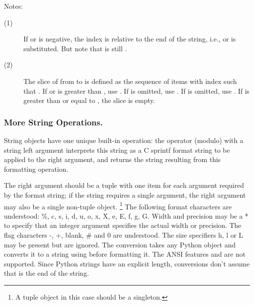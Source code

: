 \noindent
Notes:

\begin{description}
  
\item[(1)] If  or  is negative, the index is relative to
  the end of the string, i.e.,  or
   is substituted.  But note that  is
  still .
  
\item[(2)] The slice of  from  to  is defined as
  the sequence of items with index  such that .  If  or  is greater than
  , use .  If  is omitted,
  use .  If  is omitted, use .  If
   is greater than or equal to , the slice is empty.

\end{description}

\subsubsection{More String Operations.}

String objects have one unique built-in operation: the \code{\%}
operator (modulo) with a string left argument interprets this string
as a C sprintf format string to be applied to the right argument, and
returns the string resulting from this formatting operation.

The right argument should be a tuple with one item for each argument
required by the format string; if the string requires a single
argument, the right argument may also be a single non-tuple object.%
\footnote{A tuple object in this case should be a singleton.}
The following format characters are understood:
\%, c, s, i, d, u, o, x, X, e, E, f, g, G.
Width and precision may be a * to specify that an integer argument
specifies the actual width or precision.  The flag characters -, +,
blank, \# and 0 are understood.  The size specifiers h, l or L may be
present but are ignored.  The  conversion takes any Python
object and converts it to a string using  before
formatting it.  The ANSI features  and 
are not supported.  Since Python strings have an explicit length,
 conversions don't assume that  is the end of
the string.

